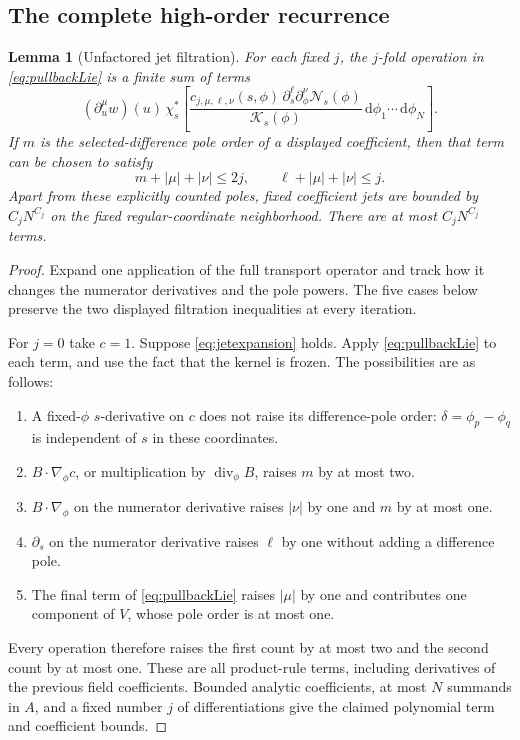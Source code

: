 \documentclass[11pt]{article}
\numberwithin{equation}{section}
\newtheorem{lemma}[theorem]{Lemma}
\theoremstyle{definition}
\newcommand{\dd}{\,\mathrm d}
\begin{document}
\subsection{The complete high-order recurrence}
\begin{lemma}[Unfactored jet filtration]\label{lem:jets}
For each fixed \(j\), the \(j\)-fold operation in
\eqref{eq:pullbackLie} is a finite sum of terms
\begin{equation}
 (\partial_u^\mu w)(u)\,
 \chi_s^*\left[
  \frac{c_{j,\mu,\ell,\nu}(s,\phi)\,
        \partial_s^\ell\partial_\phi^\nu\mathscr N_s(\phi)}
       {\mathcal K_s(\phi)}
       \dd\phi_1\cdots\dd\phi_N\right].
 \label{eq:jetexpansion}
\end{equation}
If \(m\) is the selected-difference pole order of a displayed
coefficient, then that term can be chosen to satisfy
\begin{equation}
 m+|\mu|+|\nu|\le2j,\qquad
 \ell+|\mu|+|\nu|\le j .
 \label{eq:jetdegree}
\end{equation}
Apart from these explicitly counted poles, fixed coefficient jets
are bounded by \(C_jN^{C_j}\) on the fixed regular-coordinate
neighborhood. There are at most \(C_jN^{C_j}\) terms.
\end{lemma}
\begin{proof}
Expand one application of the full transport operator and track how it changes the numerator derivatives and the pole powers. The five cases below preserve the two displayed filtration inequalities at every iteration.

For \(j=0\) take \(c=1\). Suppose \eqref{eq:jetexpansion} holds.
Apply \eqref{eq:pullbackLie} to each term, and use the fact that
the kernel is frozen. The possibilities are as follows:
\begin{enumerate}
\item A fixed-\(\phi\) \(s\)-derivative on \(c\) does not raise its
difference-pole order: \(\delta=\phi_p-\phi_q\) is independent of
\(s\) in these coordinates.
\item \(B\cdot\nabla_\phi c\), or multiplication by
\(\operatorname{div}_\phi B\), raises \(m\) by at most two.
\item \(B\cdot\nabla_\phi\) on the numerator derivative raises
\(|\nu|\) by one and \(m\) by at most one.
\item \(\partial_s\) on the numerator derivative raises \(\ell\)
by one without adding a difference pole.
\item The final term of \eqref{eq:pullbackLie} raises \(|\mu|\)
by one and contributes one component of \(V\), whose pole
order is at most one.
\end{enumerate}
Every operation therefore raises the first count by at most two
and the second count by at most one. These are all product-rule
terms, including derivatives of the previous field coefficients.
Bounded analytic coefficients, at most \(N\) summands in \(A\),
and a fixed number \(j\) of differentiations give the claimed
polynomial term and coefficient bounds.
\end{proof}
\end{document}
